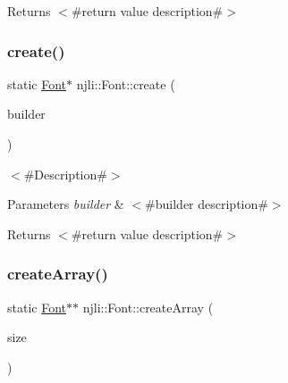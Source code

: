 \begin{DoxyReturn}{Returns}
$<$\#return value description\#$>$ 
\end{DoxyReturn}
\mbox{\label{classnjli_1_1_font_a67923e02c5b1f11350d1d0be02c5329c}} 
\subsubsection{\texorpdfstring{create()}{create()}\hspace{0.1cm}{\footnotesize\ttfamily [3/3]}}
{\footnotesize\ttfamily static \mbox{\hyperlink{classnjli_1_1_font}{Font}}$\ast$ njli\+::\+Font\+::create (\begin{DoxyParamCaption}\item[{const \mbox{\hyperlink{classnjli_1_1_font_builder}{Font\+Builder}} \&}]{builder }\end{DoxyParamCaption})\hspace{0.3cm}{\ttfamily [static]}}

$<$\#\+Description\#$>$


\begin{DoxyParams}{Parameters}
{\em builder} & $<$\#builder description\#$>$\\
\hline
\end{DoxyParams}
\begin{DoxyReturn}{Returns}
$<$\#return value description\#$>$ 
\end{DoxyReturn}
\mbox{\label{classnjli_1_1_font_a09c8252c07f9654854e9d600ad248e63}} 
\subsubsection{\texorpdfstring{create\+Array()}{createArray()}}
{\footnotesize\ttfamily static \mbox{\hyperlink{classnjli_1_1_font}{Font}}$\ast$$\ast$ njli\+::\+Font\+::create\+Array (\begin{DoxyParamCaption}\item[{const \mbox{\hyperlink{_util_8h_a10e94b422ef0c20dcdec20d31a1f5049}{u32}}}]{size }\end{DoxyParamCaption})\hspace{0.3cm}{\ttfamily [static]}}

